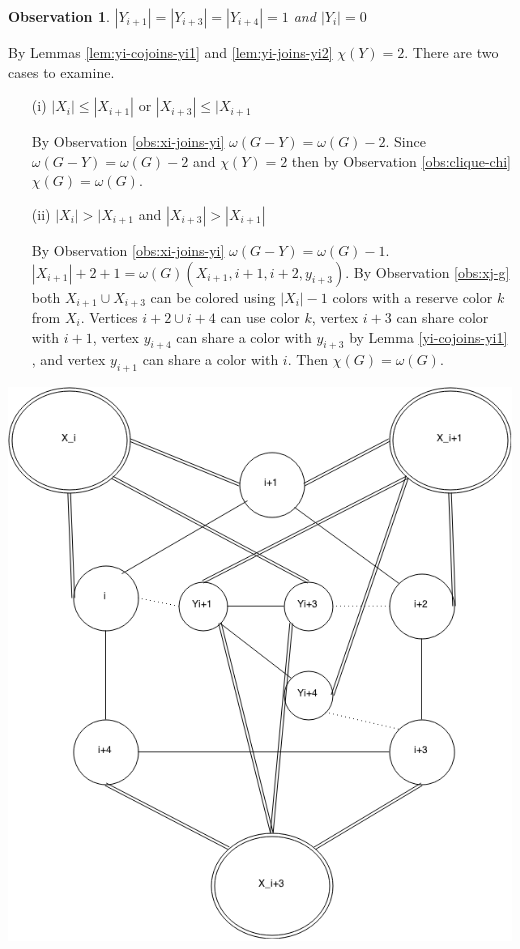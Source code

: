 \documentclass[12pt]{article}
\newtheorem{Observation}[Theorem]{Observation}
\begin{document}
\begin{Observation}\label{obs:yi1-yi3-yi4} 
$|Y_{i+1}| = |Y_{i+3}| =  |Y_{i+4}| = 1$ and $|Y_{i}| = 0$
\end{Observation}

\begin{minipage}{0.5\textwidth}%
	 By Lemmas \ref{lem:yi-cojoins-yi1} and \ref{lem:yi-joins-yi2} $\chi(Y) = 2$. There are two cases to examine.
	\begin{itemize}
	\item[(i)]
		$|X_i| \leq |X_{i+1}|$ or $|X_{i+3}| \leq |X_{i+1}$

		 By Observation \ref{obs:xi-joins-yi} $\omega(G - Y) = \omega(G) - 2$. Since $\omega(G - Y) = \omega(G) - 2$ and $\chi(Y) = 2$ then by Observation \ref{obs:clique-chi} $\chi(G) = \omega(G)$.
	\item[(ii)]
		$|X_i| > |X_{i+1}$ and $|X_{i+3}| > |X_{i+1}|$

		By Observation \ref{obs:xi-joins-yi} $\omega(G - Y) = \omega(G) - 1$. $|X_{i+1}| + 2 + 1 = \omega(G) (X_{i+1},i+1,i+2, y_{i+3})$. By Observation \ref{obs:xj-g} both $X_{i+1} \cup X_{i+3}$ can be colored using $|X_{i}| - 1$ colors with a reserve color $k$ from $X_{i}$. Vertices $i+2 \cup i+4$ can use color $k$, vertex $i+3$ can share color with $i+1$, vertex $y_{i+4}$ can share a color with $y_{i+3}$ by Lemma \ref{yi-cojoins-yi1} , and vertex $y_{i+1}$ can share a color with $i$.  Then $\chi(G) = \omega(G)$.
	\end{itemize}
\end{minipage}
\hfill
\begin{minipage}{0.5\textwidth}\raggedleft
	\includegraphics[width=\linewidth]{Yi1-Yi3-Yi4.png}
\end{minipage}
\end{document}

